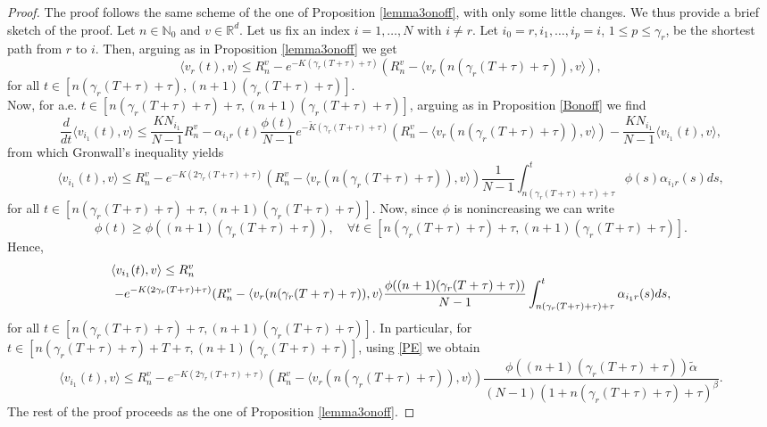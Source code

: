 \documentclass[11pt]{article}
\begin{document}
	\begin{proof}
     The proof follows the same scheme of the one of Proposition \ref{lemma3onoff}, with only some little changes. We thus provide a brief sketch of the proof. Let $n\in \mathbb{N}_0$ and $v \in \mathbb{R}^d$. Let us fix an index $i=1,\dots,N$ with $i\neq r$. Let $i_0=r,i_1,\dots,i_p=i$, $1\leq p\leq \gamma_r$, be the shortest path from $r$ to $i$. Then, arguing as in Proposition \ref{lemma3onoff} we get
		\begin{equation}\label{firstgroncs}
			\langle v_r(t),v\rangle\leq R_n^v-e^{-K(\gamma_r(T+\tau)+\tau)}(R_n^v-\langle v_r(n(\gamma_r(T+\tau)+\tau)),v\rangle),
		\end{equation}
         for all $t\in [n(\gamma_r(T+\tau)+\tau),(n+1)(\gamma_r (T+\tau)+\tau)].$ 
		\\Now, for a.e. $t \in [n(\gamma_r(T+\tau)+\tau)+\tau,(n+1)(\gamma_r (T+\tau)+\tau)]$, arguing as in Proposition \ref{Bonoff} we find
		$$\frac{d}{d t}  \langle v_{i_1}(t),v\rangle \leq \frac{KN_{i_{1}}}{N-1} R_n^v-\alpha_{i_1r}(t)\frac{\phi(t)}{N-1}e^{-\tilde K(\gamma_r(T+\tau)+\tau)}(R_n^v-\langle v_r(n(\gamma_r(T+\tau)+\tau)),v\rangle)-\frac{  KN_{i_{1}}}{N-1}\langle v_{i_1}(t),v\rangle,$$
		from which Gronwall's inequality yields
		$$\langle v_{i_1}(t),v\rangle\leq 
		R^v_n-e^{- K(2\gamma_r(T+\tau)+\tau)}(R_n^v-\langle v_r(n(\gamma_r(T+\tau)+\tau)),v\rangle)\frac{1}{N-1}\int_{n(\gamma_r(T+\tau)+\tau)+\tau}^{t} \phi(s)\alpha_{i_1r}(s)ds,$$
		for all $t\in [n(\gamma_r(T+\tau)+\tau)+\tau,(n+1)(\gamma_r(T+\tau)+\tau)]$. Now, since $\phi$ is nonincreasing we can write
		$$\phi(t)\geq \phi((n+1)(\gamma_r(T+\tau)+\tau)),\quad \forall t\in [n(\gamma_r(T+\tau)+\tau)+\tau,(n+1)(\gamma_r(T+\tau)+\tau)].$$
		Hence,
		$$ 
		\begin{array}{l}
			\displaystyle{
		\langle v_{i_1}(t),v\rangle\leq R^v_n}\\
		\displaystyle{ \hspace{0.1 cm}-e^{-K(2\gamma_r(T+\tau)+\tau)} (R_n^v-\langle v_r(n(\gamma_r(T+\tau)+\tau)),v\rangle \frac{\phi((n+1)(\gamma_r(T+\tau)+\tau))}{N-1}\int_{n(\gamma_r(T+\tau)+\tau)+\tau}^{t}\alpha_{i_1r}(s)ds,}
		\end{array}
		$$
		for all $t\in [n(\gamma_r(T+\tau)+\tau)+\tau,(n+1)(\gamma_r(T+\tau)+\tau)]$. In particular, for $t\in [n(\gamma_r(T+\tau)+\tau)+T+\tau,(n+1)(\gamma_r(T+\tau)+\tau)]$, using \eqref{PE} we obtain
		\begin{equation}\label{i_1Tcs}
			\langle v_{i_1}(t),v\rangle\leq R^v_n-e^{- K(2\gamma_r(T+\tau)+\tau)}(R_n^v-\langle v_r(n(\gamma_r(T+\tau)+\tau)),v\rangle)\frac{\phi((n+1)(\gamma_r(T+\tau)+\tau))\tilde{\alpha}}{(N-1)(1+n(\gamma_r(T+\tau)+\tau)+\tau)^\beta}.
		\end{equation}
	The rest of the proof proceeds as the one of Proposition \ref{lemma3onoff}.	
	\end{proof} 
	
\end{document}
